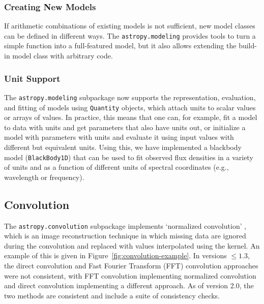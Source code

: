 \documentclass[modern]{aastex61}
\newcommand{\package}[1]{\texttt{#1}\xspace}
\renewcommand{\figurename}{Figure\xspace}
\begin{document}
\subsubsection{Creating New Models}
If arithmetic combinations of existing models is not sufficient, new model classes can be defined in different ways. The \package{astropy.modeling} provides tools to turn a simple function into a full-featured model, but it also allows extending the build-in model class with arbitrary code.

\subsubsection{Unit Support}

The \package{astropy.modeling} subpackage now supports the representation, evaluation, and fitting of models using \texttt{Quantity} objects, which attach units to scalar values or arrays of values. In practice, this means that one can, for example, fit a model to data with units and get parameters that also have units out, or initialize a model with parameters with units and evaluate it using input values with different but equivalent units. Using this, we have implemented a blackbody model (\texttt{BlackBody1D}) that can be used to fit observed flux densities in a variety of units and as a function of different units of spectral coordinates (e.g., wavelength or frequency).

\subsection{Convolution}

The \package{astropy.convolution} subpackage implements `normalized convolution' \citep[e.g.,][]{Knutsson1993}, which is an image reconstruction technique in which missing data are ignored during the convolution and replaced with values interpolated using the kernel.   An example of this is given in \figurename~\ref{fig:convolution-example}.  In versions $\leq 1.3$, the direct convolution and Fast Fourier Transform (FFT) convolution approaches were not consistent, with FFT convolution implementing normalized convolution and direct convolution implementing a different approach.  As of version 2.0, the two methods are consistent and include a suite of consistency checks.
\end{document}
